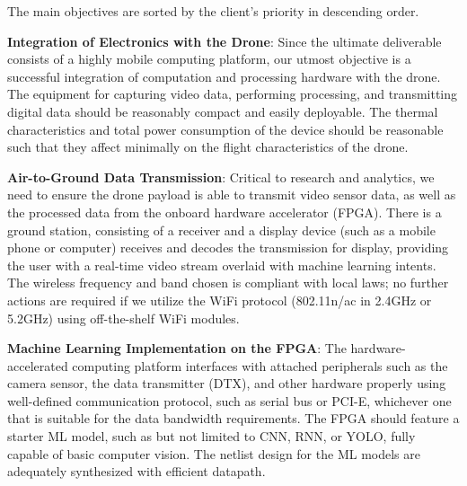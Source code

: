 The main objectives are sorted by the client's priority in descending order.

\textbf{Integration of Electronics with the Drone}:
Since the ultimate deliverable consists of a highly mobile computing platform,
our utmost objective is a successful integration of computation and processing hardware with the drone.
The equipment for capturing video data, performing processing, and transmitting digital data should be reasonably compact and easily deployable.
The thermal characteristics and total power consumption of the device should be reasonable such that they affect minimally
on the flight characteristics of the drone.

\textbf{Air-to-Ground Data Transmission}:
Critical to research and analytics, we need to ensure the drone payload is able to transmit video sensor data, as well as the processed data
from the onboard hardware accelerator (FPGA). There is a ground station, consisting of a receiver and a display device (such as a mobile phone or 
computer) receives and decodes the transmission for display, providing the user with a real-time video stream overlaid with machine learning intents.
The wireless frequency and band chosen is compliant with local laws; no further actions are required if we utilize the WiFi protocol (802.11n/ac in 2.4GHz or 5.2GHz)
using off-the-shelf WiFi modules.

\textbf{Machine Learning Implementation on the FPGA}:
The hardware-accelerated computing platform interfaces with attached peripherals such as the camera sensor, the data transmitter (DTX), and other hardware properly
using well-defined communication protocol, such as serial bus or PCI-E, whichever one that is suitable for the data bandwidth requirements. 
The FPGA should feature a starter ML model, such as but not limited to CNN, RNN, or YOLO, fully capable of basic computer vision.
The netlist design for the ML models are adequately synthesized with efficient datapath.
